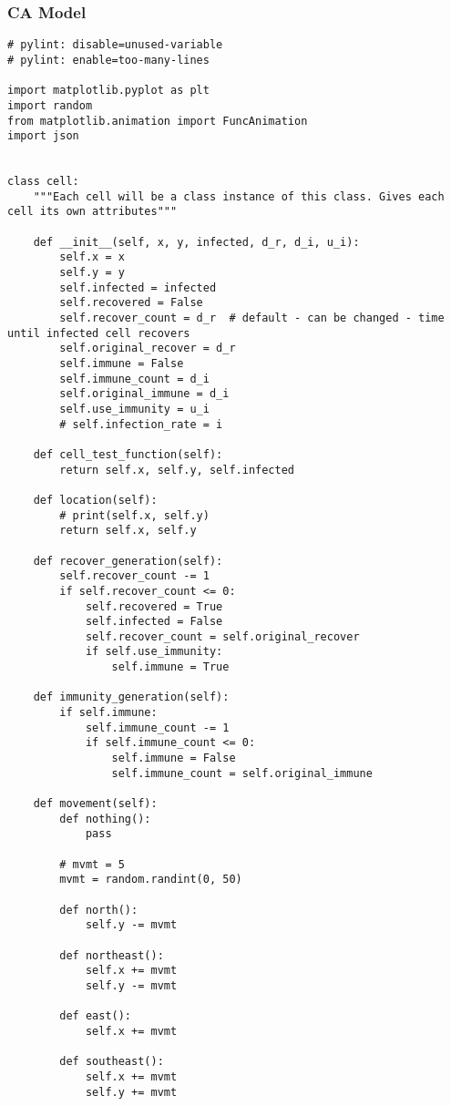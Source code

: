 \documentclass[11pt, a4paper]{article}
\begin{document}
\subsubsection{CA Model}
\begin{lstlisting}
# pylint: disable=unused-variable
# pylint: enable=too-many-lines

import matplotlib.pyplot as plt
import random
from matplotlib.animation import FuncAnimation
import json


class cell:
    """Each cell will be a class instance of this class. Gives each cell its own attributes"""

    def __init__(self, x, y, infected, d_r, d_i, u_i):
        self.x = x
        self.y = y
        self.infected = infected
        self.recovered = False
        self.recover_count = d_r  # default - can be changed - time until infected cell recovers
        self.original_recover = d_r
        self.immune = False
        self.immune_count = d_i
        self.original_immune = d_i
        self.use_immunity = u_i
        # self.infection_rate = i

    def cell_test_function(self):
        return self.x, self.y, self.infected

    def location(self):
        # print(self.x, self.y)
        return self.x, self.y

    def recover_generation(self):
        self.recover_count -= 1
        if self.recover_count <= 0:
            self.recovered = True
            self.infected = False
            self.recover_count = self.original_recover
            if self.use_immunity:
                self.immune = True

    def immunity_generation(self):
        if self.immune:
            self.immune_count -= 1
            if self.immune_count <= 0:
                self.immune = False
                self.immune_count = self.original_immune

    def movement(self):
        def nothing():
            pass

        # mvmt = 5
        mvmt = random.randint(0, 50)

        def north():
            self.y -= mvmt

        def northeast():
            self.x += mvmt
            self.y -= mvmt

        def east():
            self.x += mvmt

        def southeast():
            self.x += mvmt
            self.y += mvmt


\end{lstlisting}
\end{document}
